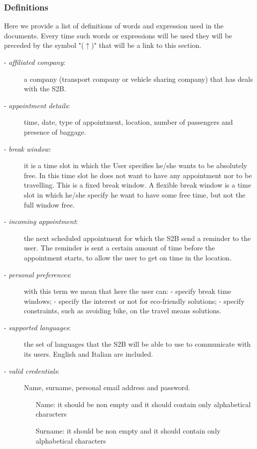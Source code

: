	\subsubsection{Definitions}
		\label{definitions}
		Here we provide a list of definitions of words and expression used in the documents. Every time such words or expressions will be used they will be preceded by the symbol "($\uparrow$)" that will be a link to this section.
		\begin{description}
			\item[- \textit{affiliated company}:] a company (transport company or vehicle sharing company) that has deals with the S2B.
			\item[- \textit{appointment details}:] time, date, type of appointment, location, number of passengers and presence of baggage.
			\item[- \textit{break window}:] it is a time slot in which the User specifies he/she wants to be absolutely free. In this time slot he does not want to have any appointment nor to be travelling. This is a fixed break window. A flexible break window is a time slot in which he/she specify he want to have some free time, but not the full window free.
			\item[- \textit{incoming appointment}:] the next scheduled appointment for which the S2B send a reminder to the user. The reminder is sent  a certain amount of time before the appointment starts, to allow the user to get on time in the location.
			\item[- \textit{personal preferences}:] with this term we mean that here the user can:\newline
			- specify break time windows; \newline
			- specify the interest or not for eco-friendly solutions;\newline
			- specify constraints, such as avoiding  bike, on the travel means solutions.
			\item[- \textit{supported languages}:] the set of languages that the S2B will be able to use to communicate with its users. English and Italian are included.
			\item[- \textit{valid credentials}:] Name, surname, personal email address and password.
			\begin{itemize}
				\item[Name:] it should be non empty and it should contain only alphabetical characters
				\item[Surname:] it should be non empty and it should contain only alphabetical characters

\end{itemize}
\end{description}
